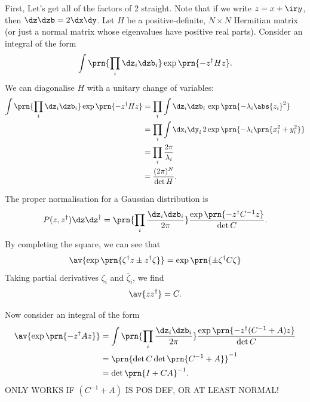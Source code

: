\documentclass[12pt]{article}
\newcommand{\inv}{^{-1}}
\newcommand{\dg}{^\dagger}
\begin{document}
First, Let's get all of the factors of 2 straight.
Note that if we write $z=x+\ir y$, then $\dz\dzb = 2\dx\dy$.
Let $H$ be a positive-definite, $N\times N$ Hermitian matrix
(or just a normal matrix whose eigenvalues have positive real parts).
Consider an integral  of the form
%
\begin{equation*}
  \int \prn{\prod_i\dz_i\dzb_i} \exp\prn{-z\dg H z}.
\end{equation*}
%
We can diagonalise $H$ with a unitary change of variables:
%
\begin{equation}\label{eq:compgausint}
\begin{aligned}
  \int \prn{\prod_i\dz_i\dzb_i} \exp\prn{-z\dg H z} &=
    \prod_i \int \dz_i\dzb_i\, \exp\prn{-\lambda_i \abs{z_i}^2} \\
    &= \prod_i \int \dx_i\dy_i\, 2\exp\prn{-\lambda_i \prn{x_i^2+y_i^2}} \\
    &= \prod_i \frac{2\pi}{\lambda_i}\\
    &= \frac{(2\pi)^N}{\det H}.
\end{aligned}
\end{equation}
%

The proper normalisation for a Gaussian distribution is
%
\begin{equation}\label{eq:compgaussnorm}
  P(z,z\dg)\dz\dz\dg = \prn{\prod_i\frac{\dz_i\dzb_i}{2\pi}} \frac{\exp\prn{-z\dg C\inv z}}{\det C}.
\end{equation}
%
By completing the square, we can see that
%
\begin{equation}\label{eq:compgausslin}
  \av{\exp\prn{\zeta\dg z \pm z\dg\zeta}} = \exp\prn{\pm\zeta\dg C\zeta}
\end{equation}
%
Taking partial derivatives \wrt $\zeta_i$ and $\bar{\zeta}_i$, we find
%
\begin{equation}\label{eq:compgauscov}
  \av{zz\dg} = C.
\end{equation}
%

Now consider an integral of the form
%
\begin{equation}\label{eq:compgaussquad}
\begin{aligned}
  \av{\exp\prn{-z\dg A z}} &=
    \int \prn{\prod_i\frac{\dz_i\dzb_i}{2\pi}}\frac{\exp\prn{-z\dg (C\inv+A) z}}{\det C} \\
    &= \prn{\det C\det\prn{C\inv+A}}\inv \\
    &= \det\prn{I+CA}\inv.
\end{aligned}
\end{equation}
%
ONLY WORKS IF $(C\inv+A)$ IS POS DEF, OR AT LEAST NORMAL!
\end{document}
